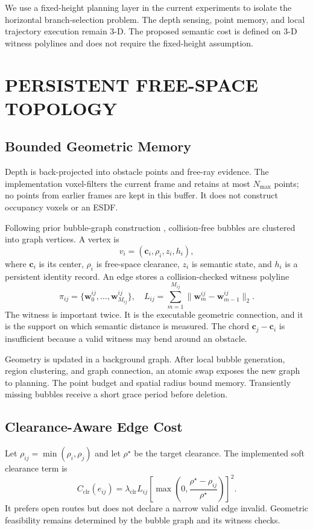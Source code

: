\documentclass[letterpaper,10pt,conference]{ieeeconf}
\newcommand{\vect}[1]{\boldsymbol{#1}}
\begin{document}
We use a fixed-height planning layer in the current experiments to isolate the
horizontal branch-selection problem.
The depth sensing, point memory, and local trajectory execution remain 3-D.
The proposed semantic cost is defined on 3-D witness polylines and does not
require the fixed-height assumption.

\section{PERSISTENT FREE-SPACE TOPOLOGY}
\label{sec:topology}
\subsection{Bounded Geometric Memory}
Depth is back-projected into obstacle points and free-ray evidence.
The implementation voxel-filters the current frame and retains at most
$N_{\max}$ points; no points from earlier frames are kept in this buffer.
It does not construct occupancy voxels or an ESDF.

Following prior bubble-graph construction \cite{epic}, collision-free bubbles
are clustered into graph vertices.
A vertex is
\begin{equation}
 v_i=(\vect{c}_i,\rho_i,z_i,h_i),
\end{equation}
where $\vect{c}_i$ is its center, $\rho_i$ is free-space clearance, $z_i$ is
semantic state, and $h_i$ is a persistent identity record.
An edge stores a collision-checked witness polyline
\begin{equation}
 \pi_{ij}=\{\vect{w}^{ij}_0,\ldots,\vect{w}^{ij}_{M_{ij}}\},
 \quad
 L_{ij}=\sum_{m=1}^{M_{ij}}
 \|\vect{w}^{ij}_m-\vect{w}^{ij}_{m-1}\|_2.
\end{equation}
The witness is important twice.
It is the executable geometric connection, and it is the support on which
semantic distance is measured.
The chord $\vect{c}_j-\vect{c}_i$ is insufficient because a valid witness may
bend around an obstacle.

Geometry is updated in a background graph.
After local bubble generation, region clustering, and graph connection, an
atomic swap exposes the new graph to planning.
The point budget and spatial radius bound memory.
Transiently missing bubbles receive a short grace period before deletion.

\subsection{Clearance-Aware Edge Cost}
Let $\rho_{ij}=\min(\rho_i,\rho_j)$ and let $\rho^\star$ be the target
clearance.
The implemented soft clearance term is
\begin{equation}
 C_{\mathrm{clr}}(e_{ij})=
 \lambda_{\mathrm{clr}}L_{ij}
 \left[
 \max\left(0,\frac{\rho^\star-\rho_{ij}}{\rho^\star}\right)
 \right]^2.
\label{eq:clearance}
\end{equation}
It prefers open routes but does not declare a narrow valid edge invalid.
Geometric feasibility remains determined by the bubble graph and its witness
checks.
\end{document}
